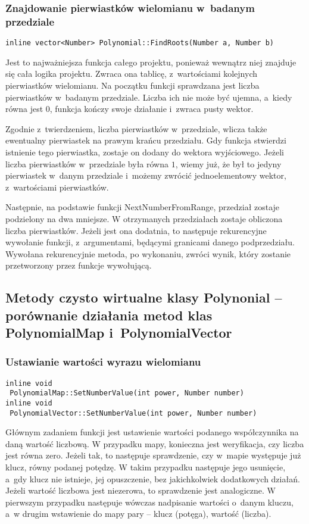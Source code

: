 \subsubsection{Znajdowanie pierwiastków wielomianu w~badanym przedziale}
\begin{lstlisting}
inline vector<Number> Polynomial::FindRoots(Number a, Number b)
\end{lstlisting}

Jest to najważniejsza funkcja całego projektu, ponieważ wewnątrz niej znajduje się cała logika projektu. Zwraca ona tablicę, z~wartościami kolejnych pierwiastków wielomianu. Na początku funkcji sprawdzana jest liczba pierwiastków w~badanym przedziale. Liczba ich nie może być ujemna, a~kiedy równa jest $0$, funkcja kończy swoje działanie i~zwraca pusty wektor.

Zgodnie z~twierdzeniem, liczba pierwiastków w~przedziale, wlicza także ewentualny pierwiastek na prawym krańcu przedziału. Gdy funkcja stwierdzi istnienie tego pierwiastka, zostaje on dodany do wektora wyjściowego. Jeżeli liczba pierwiastków w~przedziale była równa $1$, wiemy już, że był to jedyny pierwiastek w~danym przedziale i~możemy zwrócić jednoelementowy wektor, z~wartościami pierwiastków.

Następnie, na podstawie funkcji NextNumberFromRange, przedział zostaje podzielony na dwa mniejsze. W otrzymanych przedziałach zostaje obliczona liczba pierwiastków. Jeżeli jest ona dodatnia, to następuje rekurencyjne wywołanie funkcji, z~argumentami, będącymi granicami danego podprzedziału. Wywołana rekurencyjnie metoda, po wykonaniu, zwróci wynik, który zostanie przetworzony przez funkcje wywołującą. 

\subsection{Metody czysto wirtualne klasy Polynonial – porównanie działania metod klas PolynomialMap i~PolynomialVector}

\subsubsection{Ustawianie wartości wyrazu wielomianu}
\begin{lstlisting}
inline void
 PolynomialMap::SetNumberValue(int power, Number number)
inline void
 PolynomialVector::SetNumberValue(int power, Number number)
\end{lstlisting}

Głównym zadaniem funkcji jest ustawienie wartości podanego współczynnika na daną wartość liczbową. W przypadku mapy, konieczna jest weryfikacja, czy liczba jest równa zero. Jeżeli tak, to następuje sprawdzenie, czy w~mapie występuje już klucz, równy podanej potędzę. W takim przypadku następuje jego usunięcie, a~gdy klucz nie istnieje, jej opuszczenie, bez jakichkolwiek dodatkowych działań. Jeżeli wartość liczbowa jest niezerowa, to sprawdzenie jest analogiczne. W pierwszym przypadku następuje wówczas nadpisanie wartości o~danym kluczu, a~w drugim wstawienie do mapy pary – klucz (potęga), wartość (liczba).

